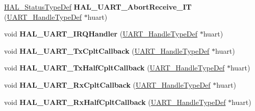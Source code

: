 \begin{DoxyCompactItemize}
\item 
\mbox{\label{group___u_a_r_t___exported___functions___group2_gaad7bc5748b849abc29d18b2ddd02876f}} 
\mbox{\hyperlink{stm32f4xx__hal__def_8h_a63c0679d1cb8b8c684fbb0632743478f}{H\+A\+L\+\_\+\+Status\+Type\+Def}} {\bfseries H\+A\+L\+\_\+\+U\+A\+R\+T\+\_\+\+Abort\+Receive\+\_\+\+IT} (\mbox{\hyperlink{struct_u_a_r_t___handle_type_def}{U\+A\+R\+T\+\_\+\+Handle\+Type\+Def}} $\ast$huart)
\item 
\mbox{\label{group___u_a_r_t___exported___functions___group2_gaad01472c507ceee3c5f2274c775ff3bf}} 
void {\bfseries H\+A\+L\+\_\+\+U\+A\+R\+T\+\_\+\+I\+R\+Q\+Handler} (\mbox{\hyperlink{struct_u_a_r_t___handle_type_def}{U\+A\+R\+T\+\_\+\+Handle\+Type\+Def}} $\ast$huart)
\item 
\mbox{\label{group___u_a_r_t___exported___functions___group2_gabcdf9b59049eccbc87d54042f9235b1a}} 
void {\bfseries H\+A\+L\+\_\+\+U\+A\+R\+T\+\_\+\+Tx\+Cplt\+Callback} (\mbox{\hyperlink{struct_u_a_r_t___handle_type_def}{U\+A\+R\+T\+\_\+\+Handle\+Type\+Def}} $\ast$huart)
\item 
\mbox{\label{group___u_a_r_t___exported___functions___group2_ga49b287e7de94cd0a38d333629298f7c4}} 
void {\bfseries H\+A\+L\+\_\+\+U\+A\+R\+T\+\_\+\+Tx\+Half\+Cplt\+Callback} (\mbox{\hyperlink{struct_u_a_r_t___handle_type_def}{U\+A\+R\+T\+\_\+\+Handle\+Type\+Def}} $\ast$huart)
\item 
\mbox{\label{group___u_a_r_t___exported___functions___group2_gae494a9643f29b87d6d81e5264e60e57b}} 
void {\bfseries H\+A\+L\+\_\+\+U\+A\+R\+T\+\_\+\+Rx\+Cplt\+Callback} (\mbox{\hyperlink{struct_u_a_r_t___handle_type_def}{U\+A\+R\+T\+\_\+\+Handle\+Type\+Def}} $\ast$huart)
\item 
\mbox{\label{group___u_a_r_t___exported___functions___group2_ga1884970cc493d8efba5aec28c0d526e7}} 
void {\bfseries H\+A\+L\+\_\+\+U\+A\+R\+T\+\_\+\+Rx\+Half\+Cplt\+Callback} (\mbox{\hyperlink{struct_u_a_r_t___handle_type_def}{U\+A\+R\+T\+\_\+\+Handle\+Type\+Def}} $\ast$huart)

\end{DoxyCompactItemize}
